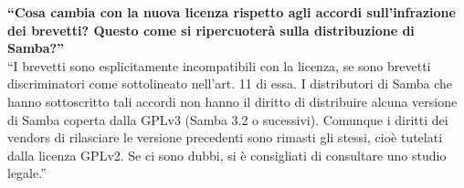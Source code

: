 \begin{footnotesize}

\textbf{``Cosa cambia con la nuova licenza rispetto agli accordi sull'infrazione dei brevetti? Questo come si ripercuoterà sulla distribuzione di Samba?''}\\

``I brevetti sono esplicitamente incompatibili con la licenza, se sono brevetti discriminatori come sottolineato nell'art. 11 di essa. I distributori di Samba che hanno sottoscritto tali accordi non hanno il diritto di distribuire alcuna versione di Samba coperta dalla GPLv3 (Samba 3.2 o sucessivi). Comunque i diritti dei vendors di rilasciare le versione precedenti sono rimasti gli stessi, cioè tutelati dalla licenza GPLv2. Se ci sono dubbi, si è consigliati di consultare uno studio legale.''\\

\end{footnotesize}


